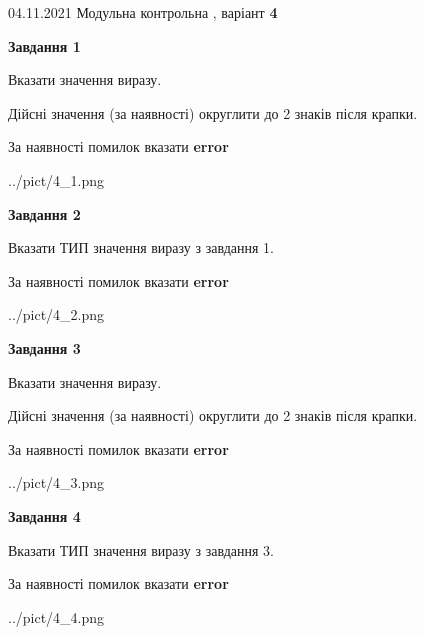 \documentclass[11pt, ukrainian]{article}
\begin{document}
{04.11.2021 Модульна контрольна , варіант  \No \textbf { 4 }\par}
{
\begin {large}
{\begin {center}\textbf{Завдання 1}\end {center}}\par
Вказати значення виразу. \par
Дійсні значення (за наявності) округлити до 2 знаків після крапки. \par
За наявності помилок вказати \textbf{error}

\begin{center}
	{../pict/4_1.png}
\end{center}
\newpage

{\begin {center}\textbf{Завдання 2}\end {center}}\par
Вказати ТИП значення виразу з завдання 1. \par
За наявності помилок вказати \textbf{error}

\begin{center}
	{../pict/4_2.png}
\end{center}
\newpage

{\begin {center}\textbf{Завдання 3}\end {center}}\par
Вказати значення виразу. \par
Дійсні значення (за наявності) округлити до 2 знаків після крапки. \par
За наявності помилок вказати \textbf{error}

\begin{center}
	{../pict/4_3.png}
\end{center}
\newpage

{\begin {center}\textbf{Завдання 4}\end {center}}\par
Вказати ТИП значення виразу з завдання 3. \par
За наявності помилок вказати \textbf{error}

\begin{center}
	{../pict/4_4.png}
\end{center}
\newpage


\end{large}}
\end{document}
